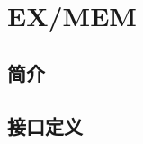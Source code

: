 \documentclass{article}
\begin{document}
\section{EX/MEM\label{sec:EX/MEM}}

\subsection{简介}

\FloatBarrier
\subsection{接口定义}

\begin{center}




    \tablelasttail{\bottomrule}

    \small
    \begin{supertabular}{lllllp{2cm}}


\end{supertabular}
\end{center}
\end{document}
